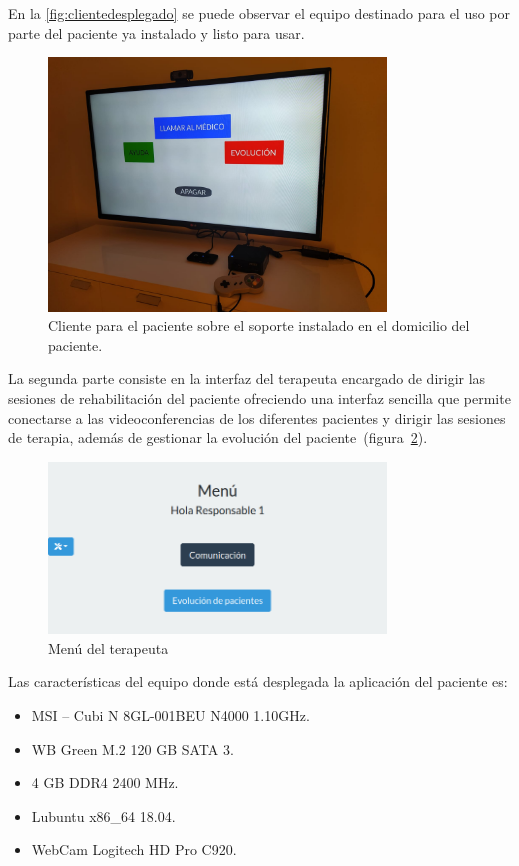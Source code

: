 En la \autoref{fig:clientedesplegado} se puede observar el equipo destinado para el uso por parte del paciente ya instalado y listo para usar.

\begin{figure}
	\centering
	\includegraphics[width=0.8\textwidth]{img/desplieguefisico2.jpeg}
	\caption{Cliente para el paciente sobre el soporte instalado en el domicilio del paciente.}
	\label{fig:clientedesplegado}
\end{figure}

La segunda parte consiste en la interfaz del terapeuta encargado de dirigir las sesiones de rehabilitación del paciente ofreciendo una interfaz sencilla que permite conectarse a las videoconferencias de los diferentes pacientes y dirigir las sesiones de terapia, además de gestionar la evolución del paciente~(figura~\ref{fig:menu_respon}).

\begin{figure}
	\centering
	\includegraphics[width=0.8\textwidth]{img/menu_responsable.png}
	\caption{Menú del terapeuta}
	\label{fig:menu_respon}
\end{figure}

Las características del equipo donde está desplegada la aplicación del paciente es:
\begin{itemize}
	\item MSI -- Cubi N 8GL-001BEU N4000 1.10GHz.
	\item WB Green M.2 120 GB SATA 3.
	\item 4 GB DDR4 2400 MHz.
	\item Lubuntu x86\_64 18.04.
	\item WebCam Logitech HD Pro C920.
\end{itemize}



